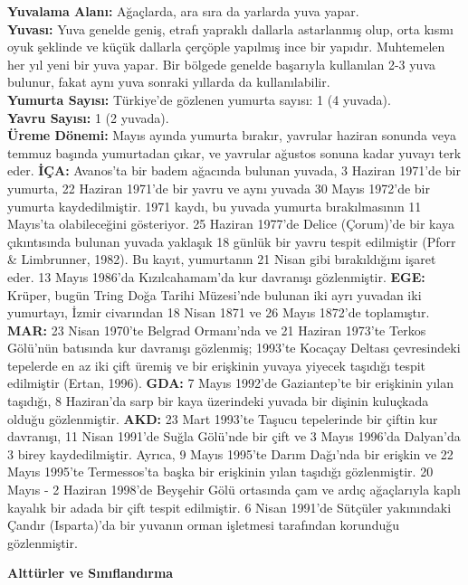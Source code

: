 \documentclass[
  a4paper,
  DIV=11,
  numbers=noendperiod]{scrreprt}
\begin{document}
\textbf{Yuvalama Alanı:} Ağaçlarda, ara sıra da yarlarda yuva yapar.\\
\textbf{Yuvası:} Yuva genelde geniş, etrafı yapraklı dallarla
astarlanmış olup, orta kısmı oyuk şeklinde ve küçük dallarla çerçöple
yapılmış ince bir yapıdır. Muhtemelen her yıl yeni bir yuva yapar. Bir
bölgede genelde başarıyla kullanılan 2-3 yuva bulunur, fakat aynı yuva
sonraki yıllarda da kullanılabilir.\\
\textbf{Yumurta Sayısı:} Türkiye'de gözlenen yumurta sayısı: 1 (4
yuvada).\\
\textbf{Yavru Sayısı:} 1 (2 yuvada).\\
\textbf{Üreme Dönemi:} Mayıs ayında yumurta bırakır, yavrular haziran
sonunda veya temmuz başında yumurtadan çıkar, ve yavrular ağustos sonuna
kadar yuvayı terk eder. \textbf{İÇA:} Avanos'ta bir badem ağacında
bulunan yuvada, 3 Haziran 1971'de bir yumurta, 22 Haziran 1971'de bir
yavru ve aynı yuvada 30 Mayıs 1972'de bir yumurta kaydedilmiştir. 1971
kaydı, bu yuvada yumurta bırakılmasının 11 Mayıs'ta olabileceğini
gösteriyor. 25 Haziran 1977'de Delice (Çorum)'de bir kaya çıkıntısında
bulunan yuvada yaklaşık 18 günlük bir yavru tespit edilmiştir (Pforr \&
Limbrunner, 1982). Bu kayıt, yumurtanın 21 Nisan gibi bırakıldığını
işaret eder. 13 Mayıs 1986'da Kızılcahamam'da kur davranışı
gözlenmiştir. \textbf{EGE:} Krüper, bugün Tring Doğa Tarihi Müzesi'nde
bulunan iki ayrı yuvadan iki yumurtayı, İzmir civarından 18 Nisan 1871
ve 26 Mayıs 1872'de toplamıştır. \textbf{MAR:} 23 Nisan 1970'te Belgrad
Ormanı'nda ve 21 Haziran 1973'te Terkos Gölü'nün batısında kur davranışı
gözlenmiş; 1993'te Kocaçay Deltası çevresindeki tepelerde en az iki çift
üremiş ve bir erişkinin yuvaya yiyecek taşıdığı tespit edilmiştir
(Ertan, 1996). \textbf{GDA:} 7 Mayıs 1992'de Gaziantep'te bir erişkinin
yılan taşıdığı, 8 Haziran'da sarp bir kaya üzerindeki yuvada bir dişinin
kuluçkada olduğu gözlenmiştir. \textbf{AKD:} 23 Mart 1993'te Taşucu
tepelerinde bir çiftin kur davranışı, 11 Nisan 1991'de Suğla Gölü'nde
bir çift ve 3 Mayıs 1996'da Dalyan'da 3 birey kaydedilmiştir. Ayrıca, 9
Mayıs 1995'te Darım Dağı'nda bir erişkin ve 22 Mayıs 1995'te
Termessos'ta başka bir erişkinin yılan taşıdığı gözlenmiştir. 20 Mayıs -
2 Haziran 1998'de Beyşehir Gölü ortasında çam ve ardıç ağaçlarıyla kaplı
kayalık bir adada bir çift tespit edilmiştir. 6 Nisan 1991'de Sütçüler
yakınındaki Çandır (Isparta)'da bir yuvanın orman işletmesi tarafından
korunduğu gözlenmiştir.

\textbf{Alttürler ve Sınıflandırma}
\end{document}
